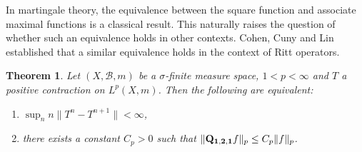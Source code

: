 \documentclass[11pt]{amsart}
\newtheorem{thm}{Theorem}[section]
\theoremstyle{definition}
\theoremstyle{remark}
\begin{document}
In martingale theory, the equivalence between the square function and associate maximal functions is a classical result. 
This naturally raises the question of whether such an equivalence holds in other contexts. 
Cohen, Cuny and Lin  \cite{CCL}  established that a similar equivalence holds in the context of Ritt operators.

\begin{thm}\label{thm:CCL}
Let $(X,\mathcal B,m)$ be a $\sigma$-finite measure space, $1 <p <\infty$ and $T$ a positive contraction on $L^p(X, m)$. Then the following are equivalent:
\begin{enumerate}
\item  $\sup_n n\lVert T^n-T^{n+1}\rVert <\infty$,
\item there exists a constant $C_p>0$ such that $\lVert {\bf Q_{1,2,1}}f \rVert_p \le C_p \lVert f\rVert_p$.
\end{enumerate}
\end{thm}
\end{document}
